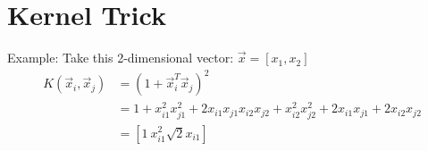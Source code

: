 \documentclass[
	number={2},
	title={Learning Linear Separators{,} SVMs and Kernels}
]{cs584notes}
\begin{document}
\section{Kernel Trick}
Example: Take this 2-dimensional vector: $\vec{x} = [x_{1}, x_{2}]$
\begin{equation*}
	\begin{aligned}
		K(\vec{x}_{i}, \vec{x}_{j}) &= (1 + \vec{x}_{i}^{T}\vec{x}_{j})^{2}\\
		&= 1 + x_{i1}^{2}x_{j1}^{2} + 2x_{i1}x_{j1}x_{i2}x_{j2} + x_{i2}^{2}x_{j2}^{2} + 2x_{i1}x_{j1} + 2x_{i2}x_{j2}\\
		&= \left[ 1\ x_{i1}^{2} \sqrt{2}x_{i1}  \right]
	\end{aligned}
\end{equation*}
\end{document}
